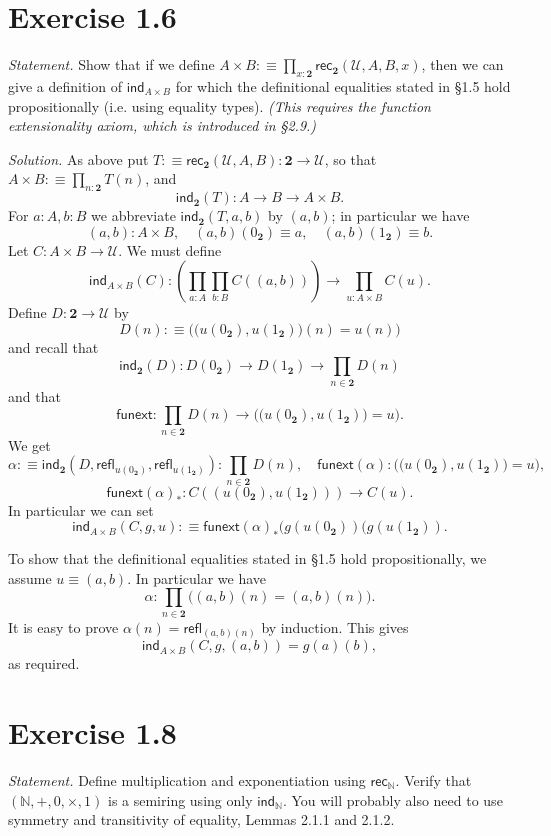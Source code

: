 \documentclass[12pt]{article}
\newcommand{\fu}{\mathsf{funext}}
\newcommand{\ind}{\mathsf{ind}}
\newcommand{\N}{\mathbb N}
\newcommand{\nn}{\noindent}
\newcommand{\rec}{\mathsf{rec}}
\newcommand{\refl}{\mathsf{refl}}
\newcommand{\two}{\mathbf2}
\newcommand{\U}{\mathcal U}
\begin{document}

\section{Exercise 1.6}

\emph{Statement.} Show that if we define $A\times B:\equiv\prod_{x:\two}\rec_\two(\U,A,B,x)$, then we can give a definition of  $\ind_{A\times B}$ for which the definitional equalities stated in \S1.5 hold propositionally (i.e. using equality types). \emph{(This requires the function extensionality axiom, which is introduced in \S2.9.)}

\nn\emph{Solution.} As above put $T:\equiv\rec_\two(\U,A,B):\two\to\U$, so that $A\times B:\equiv\prod_{n:\two}T(n)$, and 
$$
\ind_\two(T):A\to B\to A\times B.
$$ 
For $a:A,b:B$ we abbreviate $\ind_\two(T,a,b)$ by $(a,b)$; in particular we have 
$$
(a,b):A\times B,\quad(a,b)(0_\two)\equiv a,\quad(a,b)(1_\two)\equiv b.
$$ 
Let $C:A\times B\to\U$. We must define 
$$
\ind_{A\times B}(C):\left(\prod_{a:A}\prod_{b:B}C((a,b))\right)\to\prod_{u:A\times B}C(u).
$$ 
Define $D:\two\to\U$ by 
$$
D(n):\equiv\Big(\big(u(0_\two),u(1_\two)\big)(n)=u(n)\Big)
$$ 
and recall that 
$$
\ind_\two(D):D(0_\two)\to D(1_\two)\to\prod_{n\in\two}D(n)
$$ 
and that 
$$
\fu:\prod_{n\in\two}D(n)\to\Big(\big(u(0_\two),u(1_\two)\big)=u\Big).
$$
We get 
$$
\alpha:\equiv\ind_\two(D,\refl_{u(0_\two)},\refl_{u(1_\two)}):\prod_{n\in\two}D(n),\quad\fu(\alpha):\Big(\big(u(0_\two),u(1_\two)\big)=u\Big),
$$
$$
\fu(\alpha)_*:C((u(0_\two),u(1_\two)))\to C(u).
$$
In particular we can set
$$
\ind_{A\times B}(C,g,u):\equiv\fu(\alpha)_*(g(u(0_\two))(g(u(1_\two)).
$$

To show that the definitional equalities stated in \S1.5 hold propositionally, we assume $u\equiv(a,b)$. In particular we have 
$$
\alpha:\prod_{n\in\two}\Big((a,b)(n)=(a,b)(n)\Big).
$$ 
It is easy to prove $\alpha(n)=\refl_{(a,b)(n)}$ by induction. This gives 
$$
\ind_{A\times B}(C,g,(a,b))=g(a)(b),
$$ 
as required.


\section{Exercise 1.8}

\emph{Statement.} Define multiplication and exponentiation using $\rec_\N$. Verify that $(\N,+,0,\times,1)$ is a semiring using only $\ind_\N$. You will probably also need to use symmetry and transitivity of equality, Lemmas 2.1.1 and 2.1.2.
\end{document}
